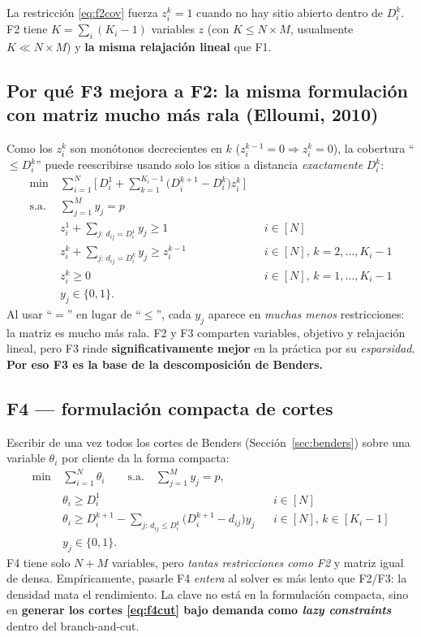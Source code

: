 La restricción \eqref{eq:f2cov} fuerza $z^k_i=1$ cuando no hay sitio abierto dentro de $D^k_i$.
F2 tiene $K=\sum_i (K_i-1)$ variables $z$ (con $K\le N\times M$, usualmente $K\ll N\times M$) y
\textbf{la misma relajación lineal} que F1.

\subsection{Por qué F3 mejora a F2: la misma formulación con matriz mucho más rala (Elloumi, 2010)}
Como los $z^k_i$ son monótonos decrecientes en $k$ ($z^{k-1}_i=0\Rightarrow z^k_i=0$), la
cobertura ``$\le D^k_i$'' puede reescribirse usando solo los sitios a distancia \emph{exactamente}
$D^k_i$:
\begin{align}
  \min\ & \sum_{i=1}^{N}\Big[\,D^1_i + \sum_{k=1}^{K_i-1}\big(D^{k+1}_i-D^k_i\big)z^k_i\,\Big] \label{eq:f3obj}\\
  \text{s.a.}\ & \sum_{j=1}^{M} y_j=p \nonumber\\
  & z^1_i + \!\!\sum_{j:\,d_{ij}=D^1_i}\!\! y_j \ge 1 && i\in[N] \label{eq:f3base}\\
  & z^k_i + \!\!\sum_{j:\,d_{ij}=D^k_i}\!\! y_j \ge z^{k-1}_i && i\in[N],\,k=2,\dots,K_i-1 \label{eq:f3rec}\\
  & z^k_i\ge 0 && i\in[N],\,k=1,\dots,K_i-1 \nonumber\\
  & y_j\in\{0,1\}. \nonumber
\end{align}
Al usar ``$=$'' en lugar de ``$\le$'', cada $y_j$ aparece en \emph{muchas menos} restricciones: la
matriz es mucho más rala. F2 y F3 comparten variables, objetivo y relajación lineal, pero F3
rinde \textbf{significativamente mejor} en la práctica por su \emph{esparsidad}. \textbf{Por eso
F3 es la base de la descomposición de Benders.}

\subsection{F4 — formulación compacta de cortes}
Escribir de una vez todos los cortes de Benders (Sección~\ref{sec:benders}) sobre una variable
$\theta_i$ por cliente da la forma compacta:
\begin{align}
  \min\ & \sum_{i=1}^N \theta_i \qquad\text{s.a.}\quad \sum_{j=1}^M y_j=p, \nonumber\\
  & \theta_i \ge D^1_i && i\in[N] \label{eq:f4base}\\
  & \theta_i \ge D^{k+1}_i-\!\!\sum_{j:\,d_{ij}\le D^k_i}\!\!\big(D^{k+1}_i-d_{ij}\big)y_j && i\in[N],\,k\in[K_i-1] \label{eq:f4cut}\\
  & y_j\in\{0,1\}. \nonumber
\end{align}
F4 tiene solo $N+M$ variables, pero \emph{tantas restricciones como F2} y matriz igual de densa.
Empíricamente, pasarle F4 \emph{entera} al solver es más lento que F2/F3: la densidad mata el
rendimiento. La clave no está en la formulación compacta, sino en \textbf{generar los cortes
\eqref{eq:f4cut} bajo demanda como \textit{lazy constraints}} dentro del branch-and-cut.

